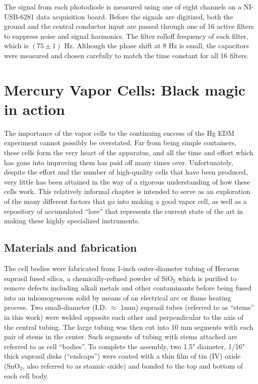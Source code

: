 \documentclass [10pt, twoside] {uwthesis}[2012/04/02]
\begin{document}
The signal from each photodiode is measured using one of eight channels on a NI-USB-6281 data acquisition board. Before the signals are digitized, both the ground and the central conductor input are passed through one of 16 active filters to suppress noise and signal harmonics. The filter rolloff frequency of each filter, which is $(75 \pm 1)$ Hz. Although the phase shift at 8 Hz is small, the capacitors were measured and chosen carefully to match the time constant for all 16 filters. 

\chapter{Mercury Vapor Cells: Black magic in action}
\label{CellChap}
The importance of the vapor cells to the continuing success of the Hg EDM experiment cannot possibly be overstated. Far from being simple containers, these cells form the very heart of the apparatus, and all the time and effort which has gone into improving them has paid off many times over. Unfortunately, despite the effort and the number of high-quality cells that have been produced, very little has been attained in the way of a rigorous understanding of how these cells work. This relatively informal chapter is intended to serve as an exploration of the many different factors that go into making a good vapor cell, as well as a repository of accumulated ``lore'' that represents the current state of the art in making these highly specialized instruments. 

\section{Materials and fabrication}
The cell bodies were fabricated from 1-inch outer-diameter tubing of Heraeus suprasil fused silica, a chemically-refined powder of SiO$_2$ which is purified to remove defects including alkali metals and other contaminants before being fused into an inhomogeneous solid by means of an electrical arc or flame heating process. Two small-diameter (I.D. $\approx$ 1mm) suprasil tubes (referred to as ``stems'' in this work) were welded opposite each other and perpendicular to the axis of the central tubing. The large tubing was then cut into 10 mm segments with each pair of stems in the center. Such segments of tubing with stems attached are referred to as cell ``bodies''. To complete the assembly, two 1.5" diameter, 1/16" thick suprasil disks (``endcaps'') were coated with a thin film of tin (IV) oxide (SnO$_2$, also referred to as stannic oxide) and bonded to the top and bottom of each cell body. 
\end{document}
